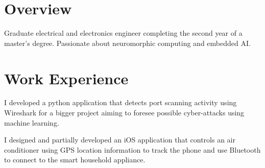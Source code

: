 \documentclass[letterpaper]{deedy-resume} %
\begin{document}
\begin{minipage}[t]{0.66\textwidth} %

\section{Overview}
\sectionspace %
Graduate electrical and electronics engineer completing the second year of a master's degree. Passionate about neuromorphic computing and embedded AI. 

\sectionspace %
\section{Work Experience}
\sectionspace %


\vspace{\topsep} %
\begin{tightitemize}
\item I developed a python application that detects port scanning activity using Wireshark for a bigger project aiming to foresee possible cyber-attacks using machine learning.
\end{tightitemize}

\sectionspace %


\begin{tightitemize}
\item I designed and partially developed an iOS application that controls an air conditioner using GPS location information to track the phone and use Bluetooth to connect to the smart household appliance.
\end{tightitemize}

\sectionspace %


\end{minipage}
\end{document}
